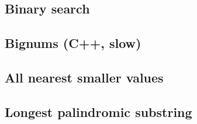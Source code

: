 \documentclass[9pt]{extarticle}
\begin{document}
\begin{multicols*}{3}
\subsection{Binary search} %


\subsection{Bignums (C++, slow)} %


\subsection{All nearest smaller values} %


\subsection{Longest palindromic substring} %

\end{multicols*}
\end{document}
